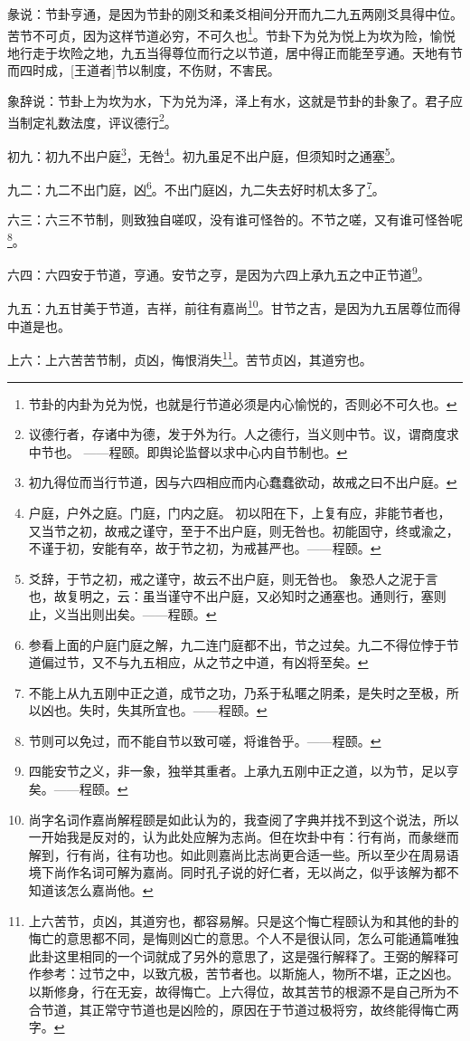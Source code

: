 \documentclass[12pt,oneside]{book}
\begin{document}
彖说：节卦亨通，是因为节卦的刚爻和柔爻相间分开而九二九五两刚爻具得中位。苦节不可贞，因为这样节道必穷，不可久也\footnote{节卦的内卦为兑为悦，也就是行节道必须是内心愉悦的，否则必不可久也。}。节卦下为兑为悦上为坎为险，愉悦地行走于坎险之地，九五当得尊位而行之以节道，居中得正而能至亨通。天地有节而四时成，[王道者]节以制度，不伤财，不害民。

象辞说：节卦上为坎为水，下为兑为泽，泽上有水，这就是节卦的卦象了。君子应当制定礼数法度，评议德行\footnote{议德行者，存诸中为德，发于外为行。人之德行，当义则中节。议，谓商度求中节也。 ——程颐。即舆论监督以求中心内自节制也。}。


初九：初九不出户庭\footnote{初九得位而当行节道，因与六四相应而内心蠢蠢欲动，故戒之曰不出户庭。}，无咎\footnote{户庭，户外之庭。门庭，门内之庭。 初以阳在下，上复有应，非能节者也，又当节之初，故戒之谨守，至于不出户庭，则无咎也。初能固守，终或渝之，不谨于初，安能有卒，故于节之初，为戒甚严也。——程颐。}。初九虽足不出户庭，但须知时之通塞\footnote{爻辞，于节之初，戒之谨守，故云不出户庭，则无咎也。 象恐人之泥于言也，故复明之，云：虽当谨守不出户庭，又必知时之通塞也。通则行，塞则止，义当出则出矣。——程颐。}。

九二：九二不出门庭，凶\footnote{参看上面的户庭门庭之解，九二连门庭都不出，节之过矣。九二不得位悖于节道偏过节，又不与九五相应，从之节之中道，有凶将至矣。}。不出门庭凶，九二失去好时机太多了\footnote{不能上从九五刚中正之道，成节之功，乃系于私暱之阴柔，是失时之至极，所以凶也。失时，失其所宜也。——程颐。}。

六三：六三不节制，则致独自嗟叹，没有谁可怪咎的。不节之嗟，又有谁可怪咎呢\footnote{节则可以免过，而不能自节以致可嗟，将谁咎乎。——程颐。}。


六四：六四安于节道，亨通。安节之亨，是因为六四上承九五之中正节道\footnote{四能安节之义，非一象，独举其重者。上承九五刚中正之道，以为节，足以亨矣。——程颐。}。

九五：九五甘美于节道，吉祥，前往有嘉尚\footnote{尚字名词作嘉尚解程颐是如此认为的，我查阅了字典并找不到这个说法，所以一开始我是反对的，认为此处应解为志尚。但在坎卦中有：行有尚，而彖继而解到，行有尚，往有功也。如此则嘉尚比志尚更合适一些。所以至少在周易语境下尚作名词可解为嘉尚。同时孔子说的好仁者，无以尚之，似乎该解为都不知道该怎么嘉尚他。}。甘节之吉，是因为九五居尊位而得中道是也。

上六：上六苦苦节制，贞凶，悔恨消失\footnote{上六苦节，贞凶，其道穷也，都容易解。只是这个悔亡程颐认为和其他的卦的悔亡的意思都不同，是悔则凶亡的意思。个人不是很认同，怎么可能通篇唯独此卦这里相同的一个词就成了另外的意思了，这是强行解释了。王弼的解释可作参考：过节之中，以致亢极，苦节者也。以斯施人，物所不堪，正之凶也。以斯修身，行在无妄，故得悔亡。上六得位，故其苦节的根源不是自己所为不合节道，其正常守节道也是凶险的，原因在于节道过极将穷，故终能得悔亡两字。}。苦节贞凶，其道穷也。
\end{document}
